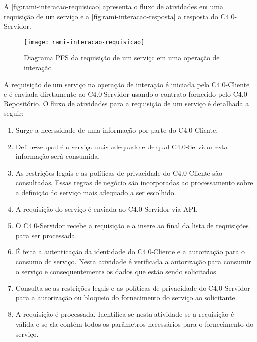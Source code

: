 A \autoref{fig:rami-interacao-requisicao} apresenta o fluxo de atividades em uma requisição de um serviço e a \autoref{fig:rami-interacao-resposta} a resposta do C4.0-Servidor.

\begin{figure}[htb]
	\centering
	\texttt{[image: rami-interacao-requisicao]}
	\caption{Diagrama PFS da requisição de um serviço em uma operação de interação.}
	\label{fig:rami-interacao-requisicao}
\end{figure}

A requisição de um serviço na operação de interação é iniciada pelo C4.0-Cliente e é enviada diretamente ao C4.0-Servidor usando o contrato fornecido pelo C4.0-Repositório. O fluxo de atividades para a requisição de um serviço é detalhada a seguir:

\begin{enumerate}

	\item Surge a necessidade de uma informação por parte do C4.0-Cliente.

	\item Define-se qual é o serviço mais adequado e de qual C4.0-Servidor esta informação será consumida.

	\item As restrições legais e as políticas de privacidade do C4.0-Cliente são consultadas. Essas regras de negócio são incorporadas ao processamento sobre a definição do serviço mais adequado a ser escolhido.

	\item A requisição do serviço é enviada ao C4.0-Servidor via API.

	\item O C4.0-Servidor recebe a requisição e a insere ao final da lista de requisições para ser processada.

	\item É feita a autenticação da identidade do C4.0-Cliente e a autorização para o consumo do serviço. Nesta atividade é verificada a autorização para consumir o serviço e consequentemente os dados que estão sendo solicitados.

	\item Consulta-se as restrições legais e as políticas de privacidade do C4.0-Servidor para a autorização ou bloqueio do fornecimento do serviço ao solicitante.

	\item A requisição é processada. Identifica-se nesta atividade se a requisição é válida e se ela contém todos os parâmetros necessários para o fornecimento do serviço.

\end{enumerate}

